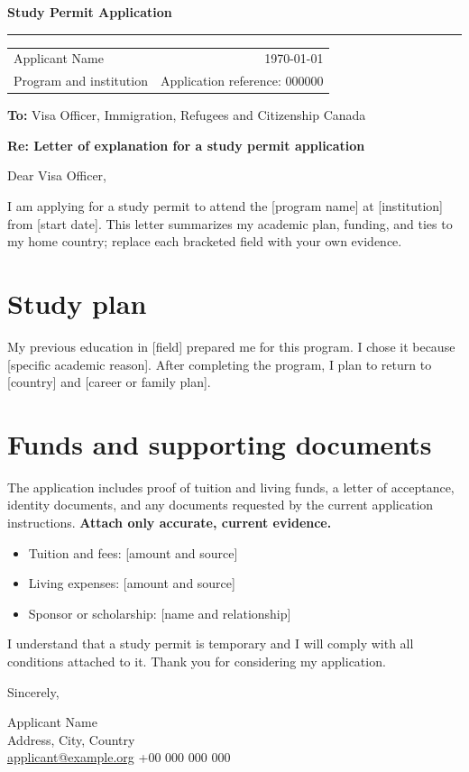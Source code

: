 \documentclass[11pt]{article}
\newcommand{\field}[2]{\textbf{#1:} #2\par}
\begin{document}
{\color{maple}\LARGE\bfseries Study Permit Application}\par
{\color{maple}\rule{\linewidth}{1.2pt}}
\vspace{6pt}
\begin{tabularx}{\linewidth}{@{}Xr@{}}
Applicant Name & \today\\
Program and institution & Application reference: 000000
\end{tabularx}
\vspace{10pt}
\field{To}{Visa Officer, Immigration, Refugees and Citizenship Canada}
\textbf{Re: Letter of explanation for a study permit application}

Dear Visa Officer,

I am applying for a study permit to attend the [program name] at [institution]
from [start date]. This letter summarizes my academic plan, funding, and ties
to my home country; replace each bracketed field with your own evidence.

\section*{Study plan}
My previous education in [field] prepared me for this program. I chose it
because [specific academic reason]. After completing the program, I plan to
return to [country] and [career or family plan].

\section*{Funds and supporting documents}
The application includes proof of tuition and living funds, a letter of
acceptance, identity documents, and any documents requested by the current
application instructions. \textbf{Attach only accurate, current evidence.}

\begin{itemize}[leftmargin=*,itemsep=2pt]
  \item Tuition and fees: [amount and source]
  \item Living expenses: [amount and source]
  \item Sponsor or scholarship: [name and relationship]
\end{itemize}

I understand that a study permit is temporary and I will comply with all
conditions attached to it. Thank you for considering my application.

Sincerely,\par\vspace{12pt}
Applicant Name\\
Address, City, Country\\
\href{mailto:applicant@example.org}{applicant@example.org} \quad +00 000 000 000
\end{document}

